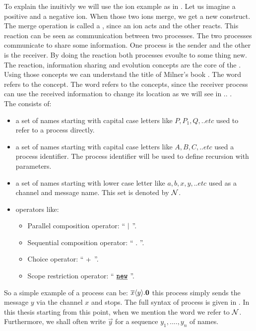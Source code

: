 To explain the \picalc{} inuitivly we will use the ion example as in \cite{milner}. Let us imagine a positive and a negative ion. When those two ions merge, we get a new construct. The merge operation is called a , since an ion acts and the other reacts. This reaction can be seen as communication between two processes. The two processes communicate to share some information.  One process is the sender and the other is the receiver. By doing the reaction both processes evoulte to some thing new. The reaction, information sharing and evolution concepts are the core of the \picalc{}. Using those concepts we can understand the title of Milner's book  \picalc{} \cite{milner}. The word  refers to the  concept. The word  refers to the  concepts, since the receiver process can use the received information to change its location as we will see in .. .
\\The \picalc{} consists of: 
\begin{itemize}
\item a set of names starting with capital case letters  like $P, P_1, Q,..etc$  used to refer to a process directly.
\item a set of names starting with capital case letters  like $A, B, C,..etc$  used a process identifier. The process identifier will be used to define recursion with parameters.
\item a set of names starting with lower case letter like $a, b, x, y,..etc$  used as a channel and message name. This set is denoted by $\mathcal N$.
\item operators like:
	\begin{itemize}
	\item  Parallel composition operator: `` $\mid$ ''.
	\item  Sequential composition operator: `` $.$ ''.
	\item  Choice operator: `` $+$ ''.
	\item  Scope restriction operator: `` $\procres{}{}$ ''.
	\end{itemize}
\end{itemize}
So a simple example of a process can be: $\overline{x}\langle y\rangle.\mathbf{0}$ this process simply sends the message $y$ via the channel $x$ and stops.
The full syntax of \picalc{} process is given in . In this thesis starting from this point, when we mention the word  we refer to $\mathcal N$. Furthermore, we shall often write $\vec{y}$ for a sequence $y_1,....,y_n$ of names.
